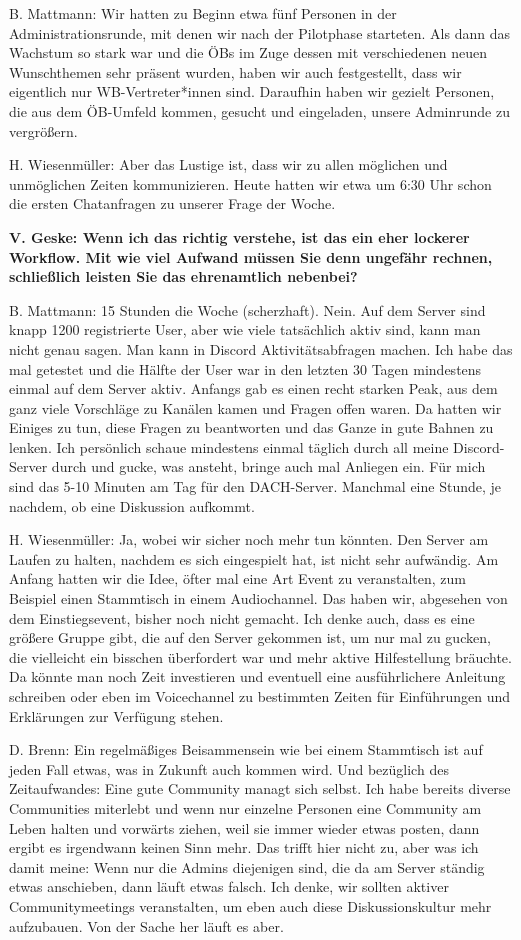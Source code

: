 \documentclass[a4paper,
fontsize=11pt,
oneside,
numbers=noperiodatend,
parskip=half-,
bibliography=totoc,
final
]{scrartcl}
\begin{document}
B. Mattmann: Wir hatten zu Beginn etwa fünf Personen in der
Administrationsrunde, mit denen wir nach der Pilotphase starteten. Als
dann das Wachstum so stark war und die ÖBs im Zuge dessen mit
verschiedenen neuen Wunschthemen sehr präsent wurden, haben wir auch
festgestellt, dass wir eigentlich nur WB-Vertreter*innen sind. Daraufhin
haben wir gezielt Personen, die aus dem ÖB-Umfeld kommen, gesucht und
eingeladen, unsere Adminrunde zu vergrößern.

H. Wiesenmüller: Aber das Lustige ist, dass wir zu allen möglichen und
unmöglichen Zeiten kommunizieren. Heute hatten wir etwa um 6:30 Uhr
schon die ersten Chatanfragen zu unserer Frage der Woche.

\textbf{V. Geske: Wenn ich das richtig verstehe, ist das ein eher
lockerer Workflow. Mit wie viel Aufwand müssen Sie denn ungefähr
rechnen, schließlich leisten Sie das ehrenamtlich nebenbei?}

B. Mattmann: 15 Stunden die Woche (scherzhaft). Nein. Auf dem Server
sind knapp 1200 registrierte User, aber wie viele tatsächlich aktiv
sind, kann man nicht genau sagen. Man kann in Discord Aktivitätsabfragen
machen. Ich habe das mal getestet und die Hälfte der User war in den
letzten 30 Tagen mindestens einmal auf dem Server aktiv. Anfangs gab es
einen recht starken Peak, aus dem ganz viele Vorschläge zu Kanälen kamen
und Fragen offen waren. Da hatten wir Einiges zu tun, diese Fragen zu
beantworten und das Ganze in gute Bahnen zu lenken. Ich persönlich
schaue mindestens einmal täglich durch all meine Discord-Server durch
und gucke, was ansteht, bringe auch mal Anliegen ein. Für mich sind das
5-10 Minuten am Tag für den DACH-Server. Manchmal eine Stunde, je
nachdem, ob eine Diskussion aufkommt.

H. Wiesenmüller: Ja, wobei wir sicher noch mehr tun könnten. Den Server
am Laufen zu halten, nachdem es sich eingespielt hat, ist nicht sehr
aufwändig. Am Anfang hatten wir die Idee, öfter mal eine Art Event zu
veranstalten, zum Beispiel einen Stammtisch in einem Audiochannel. Das
haben wir, abgesehen von dem Einstiegsevent, bisher noch nicht gemacht.
Ich denke auch, dass es eine größere Gruppe gibt, die auf den Server
gekommen ist, um nur mal zu gucken, die vielleicht ein bisschen
überfordert war und mehr aktive Hilfestellung bräuchte. Da könnte man
noch Zeit investieren und eventuell eine ausführlichere Anleitung
schreiben oder eben im Voicechannel zu bestimmten Zeiten für
Einführungen und Erklärungen zur Verfügung stehen.

D. Brenn: Ein regelmäßiges Beisammensein wie bei einem Stammtisch ist
auf jeden Fall etwas, was in Zukunft auch kommen wird. Und bezüglich des
Zeitaufwandes: Eine gute Community managt sich selbst. Ich habe bereits
diverse Communities miterlebt und wenn nur einzelne Personen eine
Community am Leben halten und vorwärts ziehen, weil sie immer wieder
etwas posten, dann ergibt es irgendwann keinen Sinn mehr. Das trifft
hier nicht zu, aber was ich damit meine: Wenn nur die Admins diejenigen
sind, die da am Server ständig etwas anschieben, dann läuft etwas
falsch. Ich denke, wir sollten aktiver Communitymeetings veranstalten,
um eben auch diese Diskussionskultur mehr aufzubauen. Von der Sache her
läuft es aber.
\end{document}
